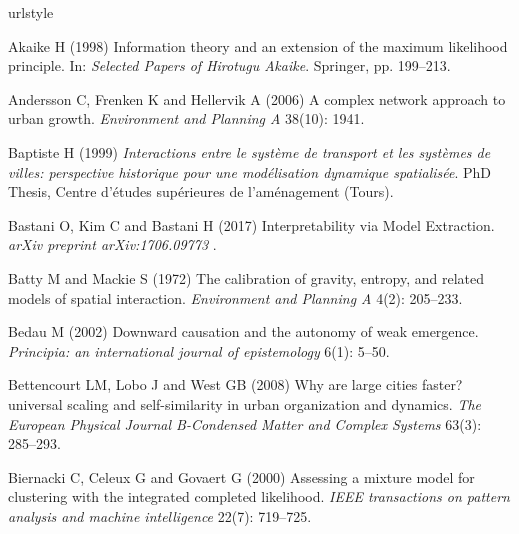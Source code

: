 \documentclass{article}
\begin{document}
\begin{thebibliography}{51}
\providecommand{\natexlab}[1]{#1}
\providecommand{\url}[1]{\texttt{#1}}
\providecommand{\urlprefix}{URL }
\expandafter\ifx\csname urlstyle\endcsname\relax
  \providecommand{\doi}[1]{DOI:\discretionary{}{}{}#1}\else
  \providecommand{\doi}{DOI:\discretionary{}{}{}\begingroup
  \urlstyle{rm}\Url}\fi

Akaike H (1998) Information theory and an extension of the maximum likelihood
  principle.
\newblock In: \emph{Selected Papers of Hirotugu Akaike}. Springer, pp.
  199--213.

Andersson C, Frenken K and Hellervik A (2006) A complex network approach to
  urban growth.
\newblock \emph{Environment and Planning A} 38(10): 1941.

Baptiste H (1999) \emph{Interactions entre le syst{\`e}me de transport et les
  syst{\`e}mes de villes: perspective historique pour une mod{\'e}lisation
  dynamique spatialis{\'e}e}.
\newblock PhD Thesis, Centre d'{\'e}tudes sup{\'e}rieures de l'am{\'e}nagement
  (Tours).

{Bastani} O, {Kim} C and {Bastani} H (2017) {Interpretability via Model
  Extraction}.
\newblock \emph{arXiv preprint arXiv:1706.09773} .

Batty M and Mackie S (1972) The calibration of gravity, entropy, and related
  models of spatial interaction.
\newblock \emph{Environment and Planning A} 4(2): 205--233.

Bedau M (2002) Downward causation and the autonomy of weak emergence.
\newblock \emph{Principia: an international journal of epistemology} 6(1):
  5--50.

Bettencourt LM, Lobo J and West GB (2008) Why are large cities faster?
  universal scaling and self-similarity in urban organization and dynamics.
\newblock \emph{The European Physical Journal B-Condensed Matter and Complex
  Systems} 63(3): 285--293.

Biernacki C, Celeux G and Govaert G (2000) Assessing a mixture model for
  clustering with the integrated completed likelihood.
\newblock \emph{IEEE transactions on pattern analysis and machine intelligence}
  22(7): 719--725.


\end{thebibliography}
\end{document}
